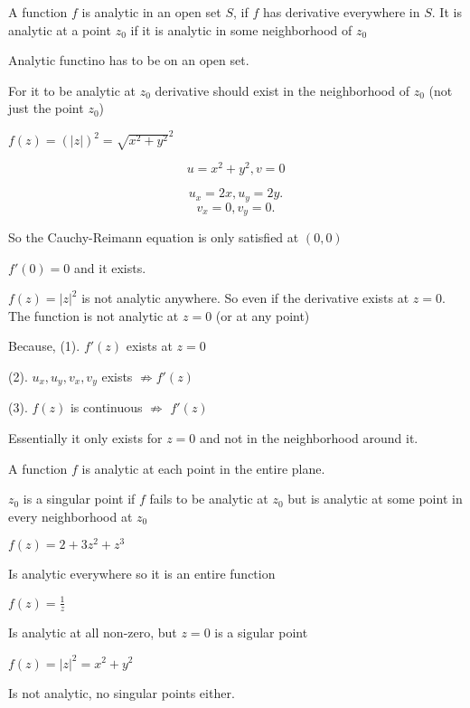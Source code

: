 \begin{definition}
   A function $f$ is analytic in an open set $S$, if $f$ has derivative everywhere in $S$. It is analytic at a point $z_0$ if it is analytic in some neighborhood of $z_0$
\end{definition}
\begin{remark}
   Analytic functino has to be on an open set.
\end{remark}
\begin{remark}
   For it to be analytic at $z_0$ derivative should exist in the neighborhood of $z_0$ (not just the point $z_0$)
\end{remark}


\begin{eg}
   $f(z) = (|z|)^2 = \sqrt{x^2+y^2}^2 $

   $$u = x^2 + y^2,v = 0$$

   \[
   u_x = 2x, u_y = 2y
   .\] 
   \[
   v_x = 0, v_y = 0
   .\] 

   So the Cauchy-Reimann equation is only satisfied at $(0,0)$

   $f'(0) = 0$ and it exists.
\end{eg}


\begin{remark}
   $f(z)= |z|^2$ is not analytic anywhere. So even if the derivative exists at $z = 0$. The function is not analytic at $z = 0$ (or at any point)

   Because, 
   (1).  $f'(z)$ exists at $z = 0$ 

   (2). $u_x,u_y,v_x,v_y$ exists  $\not \Rightarrow f'(z)$ 

   (3). $f(z)$ is continuous $\not \Rightarrow$  $f'(z)$ 

   Essentially it only exists for $z = 0$ and not in the neighborhood around it.
\end{remark}


\begin{definition}
   A function $f$ is analytic at each point in the entire plane. 
\end{definition}

\begin{definition}
   $z_0$ is a singular point if $f$ fails to be analytic at $z_0$ but is analytic at some point in every neighborhood at $z_0$
\end{definition}
\begin{eg}
   $f(z) = 2 + 3z^2 + z^3$

   Is analytic everywhere so it is an entire function
\end{eg}
\begin{eg}
   $f(z) = \frac{1}{z}$

   Is analytic at all non-zero, but $z = 0$ is a sigular point
\end{eg}
\begin{eg}
  $f(z) = |z|^2 = x^2 + y^2$

  Is not analytic, no singular points either.

\end{eg}




